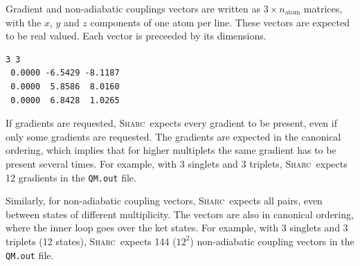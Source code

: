 \documentclass[a4paper,11pt,DIV=15,openany,twoside=false]{scrbook}
\newcommand{\sharc}{\textsc{Sharc}}
\newcommand{\ttt}[1]{\texttt{#1}}
\newenvironment{example}{
  \vspace{0mm}
  \definecolor{shadecolor}{HTML}{BBDDFF}
  \begin{shaded}
  \begin{minipage}{0.9\textwidth}
}{
  \end{minipage}
  \end{shaded}
}
\begin{document}
Gradient and non-adiabatic couplings vectors are written as $3\times n_\text{atom}$ matrices, with the $x$, $y$ and $z$ components of one atom per line. These vectors are expected to be real valued. Each vector is preceeded by its dimensions.
\begin{example}
  \begin{verbatim}
3 3 
 0.0000 -6.5429 -8.1187
 0.0000  5.8586  8.0160
 0.0000  6.8428  1.0265
  \end{verbatim}
\end{example}
If gradients are requested, \sharc\ expects every gradient to be present, even if only some gradients are requested. The gradients are expected in the canonical ordering, which implies that for higher multiplets the same gradient has to be present several times. For example, with 3 singlets and 3 triplets, \sharc\ expects 12 gradients in the \ttt{QM.out} file.

Similarly, for non-adiabatic coupling vectors, \sharc\ expects all pairs, even between states of different multiplicity. The vectors are also in canonical ordering, where the inner loop goes over the ket states. For example, with 3 singlets and 3 triplets (12 states), \sharc\ expects 144 ($12^2$) non-adiabatic coupling vectors in the \ttt{QM.out} file.
\end{document}
